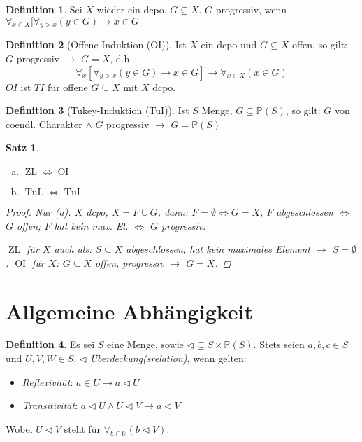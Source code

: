 \documentclass[headsepline=true,DIV=11]{scrartcl}
\newtheorem*{theorem}{Satz}
\theoremstyle{definition}
\newtheorem*{definition}{Definition}
\newcommand{\ZL}{\operatorname{ZL}}
\newcommand{\OI}{\operatorname{OI}}
\newcommand{\TuL}{\operatorname{TuL}}
\newcommand{\TuI}{\operatorname{TuI}}
\begin{document}
\begin{definition}
	Sei $X$ wieder ein dcpo, $G\subseteq X$.
	$G$ progressiv, wenn $\forall_{x\in X} [\forall_{y>x}(y\in G)\to x\in G$
\end{definition}

\begin{definition}[Offene Induktion (OI)]
	Ist $X$ ein dcpo und $G\subseteq X$ offen, so gilt: $G$ progressiv $\to$ $G=X$, d.h.
	\[\forall_x[\forall_{y>x}(y\in G)\to x\in G]\to \forall_{x\in X}(x\in G)\]
	$OI$ ist $TI$ für offene $G\subseteq X$ mit $X$ dcpo.
\end{definition}

\begin{definition}[Tukey-Induktion (TuI)]
	Ist $S$ Menge, $G\subseteq\mathbb P(S)$, so gilt:
	$G$ von coendl. Charakter $\land$ $G$ progressiv $\to$ $G=\mathbb P(S)$
\end{definition}

\begin{theorem}
	\begin{enumerate}[(a)]
		\item $\ZL \iff \OI$
		\item $\TuL \iff \TuI$
	\end{enumerate}
	\begin{proof}
		Nur (a).
		$X$ dcpo, $X=F\dot\cup G$, dann: $F=\emptyset\iff G=X$, 
		$F$ abgeschlossen $\iff$ $G$ offen;
		$F$ hat kein max. El. $\iff$ $G$ progressiv.
		
		$\ZL$ für $X$ auch als: $S\subseteq X$ abgeschlossen, hat kein maximales Element $\to$ $S=\emptyset$.
		$\OI$ für $X$: $G\subseteq X$ offen, progressiv $\to$ $G=X$.
	\end{proof}
\end{theorem}

\section*{Allgemeine Abhängigkeit}

\begin{definition}
	Es sei $S$ eine Menge, sowie $\lhd\subseteq S\times \mathbb P(S)$.
	Stets seien $a, b, c\in S$ und $U, V, W\in S$.
	$\lhd$ {\em Überdeckung(srelation)}, wenn gelten:
	\begin{itemize}
		\item {\em Reflexivität}: $a\in U\to a\lhd U$
		\item {\em Transitivität}: $ a\lhd U \land U\lhd V \to a\lhd V$
	\end{itemize}
	Wobei $U\lhd V$ steht für $\forall_{b\in U}(b\lhd V)$. %
	
\end{definition}
\end{document}
